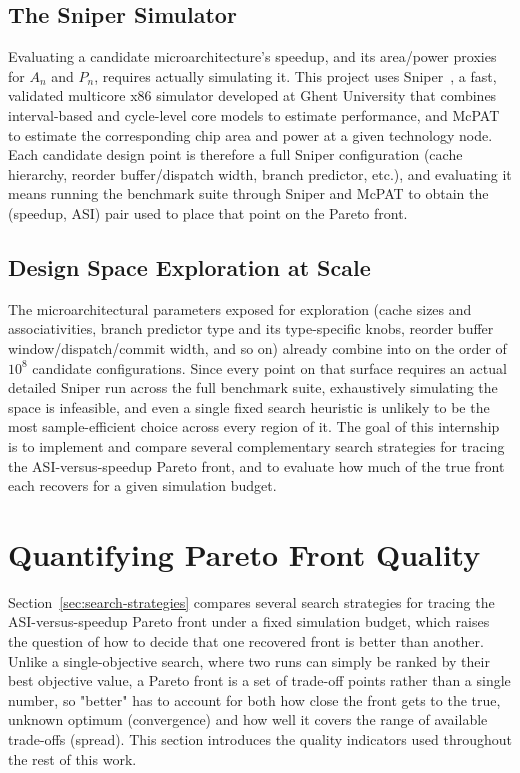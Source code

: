 \documentclass[12pt,a4paper,faculty=ea,language=en]{ugent-doc}
\begin{document}
\subsection{The Sniper Simulator}
Evaluating a candidate microarchitecture's speedup, and its area/power proxies for $A_n$ and $P_n$, requires actually simulating it. This project uses Sniper~\cite{sniper2014}, a fast, validated multicore x86 simulator developed at Ghent University that combines interval-based and cycle-level core models to estimate performance, and McPAT~\cite{mcpat2009} to estimate the corresponding chip area and power at a given technology node. Each candidate design point is therefore a full Sniper configuration (cache hierarchy, reorder buffer/dispatch width, branch predictor, etc.), and evaluating it means running the benchmark suite through Sniper and McPAT to obtain the (speedup, ASI) pair used to place that point on the Pareto front.

\subsection{Design Space Exploration at Scale}
\label{sec:dse-scale}
The microarchitectural parameters exposed for exploration (cache sizes and associativities, branch predictor type and its type-specific knobs, reorder buffer window/dispatch/commit width, and so on) already combine into on the order of $10^8$ candidate configurations. Since every point on that surface requires an actual detailed Sniper run across the full benchmark suite, exhaustively simulating the space is infeasible, and even a single fixed search heuristic is unlikely to be the most sample-efficient choice across every region of it. The goal of this internship is to implement and compare several complementary search strategies for tracing the ASI-versus-speedup Pareto front, and to evaluate how much of the true front each recovers for a given simulation budget.

\newpage

\section{Quantifying Pareto Front Quality}
Section~\ref{sec:search-strategies} compares several search strategies for tracing the ASI-versus-speedup Pareto front under a fixed simulation budget, which raises the question of how to decide that one recovered front is better than another. Unlike a single-objective search, where two runs can simply be ranked by their best objective value, a Pareto front is a set of trade-off points rather than a single number, so "better" has to account for both how close the front gets to the true, unknown optimum (convergence) and how well it covers the range of available trade-offs (spread). This section introduces the quality indicators used throughout the rest of this work.
\end{document}
